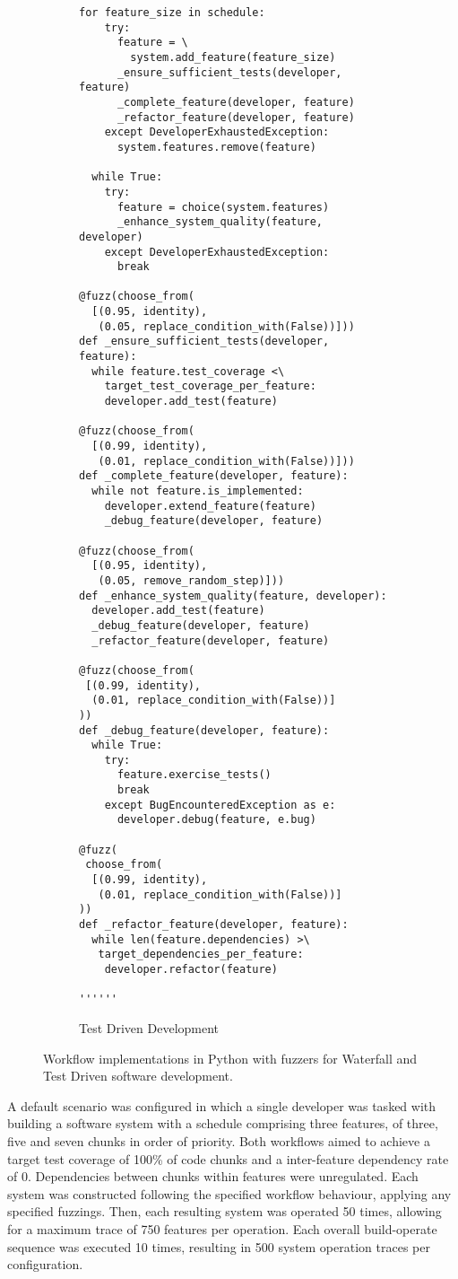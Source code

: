 \documentclass{sig-alternate}
\begin{document}
\begin{figure*}
\begin{subfigure}[b]{.45\linewidth}
\begin{lstlisting}[basicstyle=\ttfamily\scriptsize]
  for feature_size in schedule:
    try:
      feature = \
        system.add_feature(feature_size)
      _ensure_sufficient_tests(developer, feature)
      _complete_feature(developer, feature)
      _refactor_feature(developer, feature)
    except DeveloperExhaustedException:
      system.features.remove(feature)

  while True:
    try:
      feature = choice(system.features)
      _enhance_system_quality(feature, developer)
    except DeveloperExhaustedException:
      break

@fuzz(choose_from(
  [(0.95, identity), 
   (0.05, replace_condition_with(False))]))
def _ensure_sufficient_tests(developer, feature):
  while feature.test_coverage <\
    target_test_coverage_per_feature:
    developer.add_test(feature)

@fuzz(choose_from(
  [(0.99, identity), 
   (0.01, replace_condition_with(False))]))
def _complete_feature(developer, feature):
  while not feature.is_implemented:
    developer.extend_feature(feature)
    _debug_feature(developer, feature)

@fuzz(choose_from(
  [(0.95, identity), 
   (0.05, remove_random_step)]))
def _enhance_system_quality(feature, developer):
  developer.add_test(feature)
  _debug_feature(developer, feature)
  _refactor_feature(developer, feature)

@fuzz(choose_from(
 [(0.99, identity), 
  (0.01, replace_condition_with(False))]
))
def _debug_feature(developer, feature):
  while True:
    try:
      feature.exercise_tests()
      break
    except BugEncounteredException as e:
      developer.debug(feature, e.bug)

@fuzz(
 choose_from(
  [(0.99, identity), 
   (0.01, replace_condition_with(False))]
))
def _refactor_feature(developer, feature):
  while len(feature.dependencies) >\
   target_dependencies_per_feature:
    developer.refactor(feature)

''''''
\end{lstlisting}

    \caption{Test Driven Development}
  \end{subfigure}

  \caption{Workflow implementations in Python with fuzzers for Waterfall and Test Driven software development.}
  \label{fig:workflow-impl}
\end{figure*}

A default scenario was configured in which a single developer was tasked with
building a software system with a schedule comprising three features, of three,
five and seven chunks in order of priority.  Both workflows aimed to achieve a
target test coverage of 100\% of code chunks and a inter-feature dependency rate
of 0.  Dependencies between chunks within features were unregulated.  Each
system was constructed following the specified workflow behaviour, applying any
specified fuzzings.  Then, each resulting system was operated 50 times, allowing
for a maximum trace of 750 features per operation. Each overall build-operate
sequence was executed 10 times, resulting in 500 system operation traces per
configuration.
\end{document}
